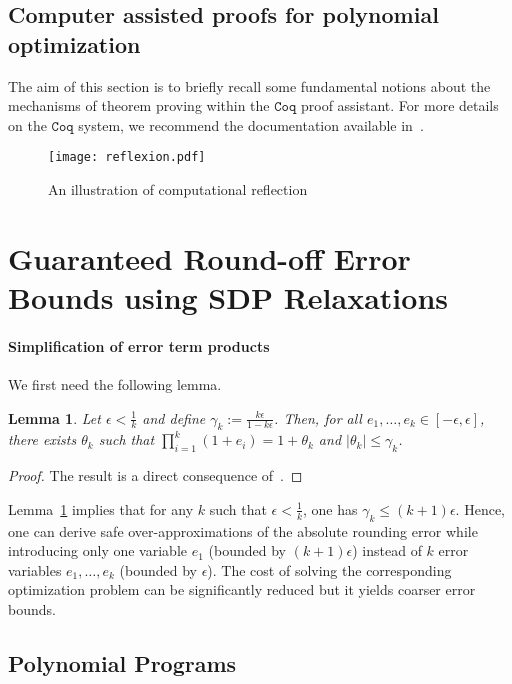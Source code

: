 \documentclass[a4paper,10pt]{article}
\newcommand{\coq}{\mathtt{Coq}}
\theoremstyle{plain}
\newtheorem{lemma}[theorem]{Lemma}
\theoremstyle{definition}
\theoremstyle{remark}
\begin{document}
\subsection{Computer assisted proofs for polynomial optimization}
\label{sec:coqbackground}
The aim of this section is to briefly recall some fundamental notions
about the mechanisms of theorem proving within the $\coq$ proof
assistant. For more details on the $\coq$ system, we recommend the
documentation available in~\cite{bertot2004interactive}.


\begin{figure}[!ht]
\centering
\texttt{[image: reflexion.pdf]}
\caption{An illustration of computational reflection}	
\label{fig:reflexion}
\end{figure}

\section{Guaranteed Round-off Error Bounds using SDP Relaxations}
\label{sec:fpsdp}

\paragraph{Simplification of error term products}
We first need the following lemma.
\begin{lemma}
\label{th:redproduct}
Let $\epsilon < \frac{1}{k}$ and define $\gamma_k := \frac{k \epsilon}{1 - k \epsilon}$. Then, for all $e_1, \dots, e_k \in [-\epsilon, \epsilon]$, there exists $\theta_k$ such that ${\displaystyle \prod_{i=1}^k (1 + e_i) = 1 + \theta_k}$ and $\mid \theta_k \mid \leq \gamma_k$.
\end{lemma}
\begin{proof}
The result is a direct consequence of~\cite[Lemma 3.3]{higham2002accuracy}.
\end{proof}
Lemma~\ref{th:redproduct} implies that for any $k$ such that $\epsilon < \frac{1}{k}$, one has $\gamma_k \leq (k + 1) \epsilon$. Hence, one can derive safe over-approximations of the absolute rounding error while introducing only one variable $e_1$ (bounded by $(k + 1) \epsilon$) instead of $k$ error variables $e_1, \dots, e_k$ (bounded by $\epsilon$). The cost of solving the corresponding optimization problem can be significantly reduced but it yields coarser error bounds.

\subsection{Polynomial Programs}
\end{document}

